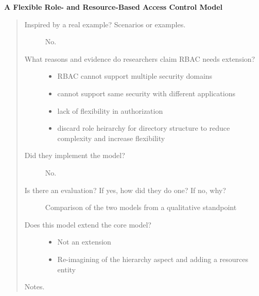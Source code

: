 \documentclass[letterpaper,10pt,english]{sphinxmanual}
\begin{document}
\textbf{A Flexible Role- and Resource-Based Access Control Model}
\begin{quote}
\begin{description}
\item[{Inspired by a real example? Scenarios or examples.}] \leavevmode
No.

\item[{What reasons and evidence do researchers claim RBAC needs extension?}] \leavevmode\begin{itemize}
\item {} 
RBAC cannot support multiple security domains

\item {} 
cannot support same security with different applications

\item {} 
lack of flexibility in authorization

\item {} 
discard role heirarchy for directory structure to reduce complexity and increase flexibility

\end{itemize}

\item[{Did they implement the model?}] \leavevmode
No.

\item[{Is there an evaluation? If yes, how did they do one? If no, why?}] \leavevmode
Comparison of the two models from a qualitative standpoint

\item[{Does this model extend the core model?}] \leavevmode\begin{itemize}
\item {} 
Not an extension

\item {} 
Re-imagining of the hierarchy aspect and adding a resources entity

\end{itemize}

\end{description}

Notes.
\end{quote}
\end{document}
